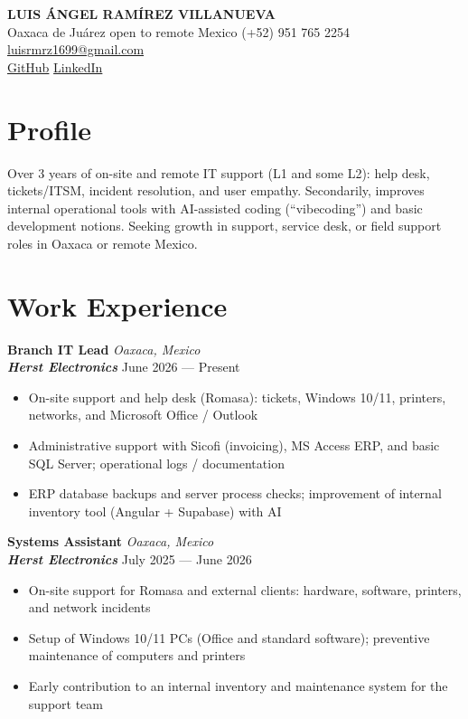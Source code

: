 \documentclass[10pt,letterpaper]{article}
\newcommand{\entry}[4]{
  \begin{minipage}[t]{\linewidth}
    \textbf{#1} \hfill \textit{#2} \\
    \textbf{\textit{#3}} \hfill #4
  \end{minipage}
}
\begin{document}

\begin{center}
	{\huge\bfseries LUIS ÁNGEL RAMÍREZ VILLANUEVA}\\[3pt]
	Oaxaca de Juárez \textbullet{} open to remote Mexico \textbullet{} (+52) 951 765 2254 \textbullet{}
	\href{mailto:luisrmrz1699@gmail.com}{luisrmrz1699@gmail.com}\\[3pt]
	\href{https://github.com/luisrmrz16}{GitHub} \textbullet{}
	\href{https://www.linkedin.com/in/luisrmrz16/}{LinkedIn}
\end{center}

\section*{Profile}

Over 3 years of on-site and remote IT support (L1 and some L2): help desk, tickets/ITSM, incident resolution, and user empathy. Secondarily, improves internal operational tools with AI-assisted coding (``vibecoding'') and basic development notions. Seeking growth in support, service desk, or field support roles in Oaxaca or remote Mexico.

\section*{Work Experience}

\entry
{Branch IT Lead}
{Oaxaca, Mexico}
{Herst Electronics}
{June 2026 --- Present}
\begin{itemize}
	\item On-site support and help desk (Romasa): tickets, Windows 10/11, printers, networks, and Microsoft Office / Outlook
	\item Administrative support with Sicofi (invoicing), MS Access ERP, and basic SQL Server; operational logs / documentation
	\item ERP database backups and server process checks; improvement of internal inventory tool (Angular + Supabase) with AI
\end{itemize}

\entry
{Systems Assistant}
{Oaxaca, Mexico}
{Herst Electronics}
{July 2025 --- June 2026}
\begin{itemize}
	\item On-site support for Romasa and external clients: hardware, software, printers, and network incidents
	\item Setup of Windows 10/11 PCs (Office and standard software); preventive maintenance of computers and printers
	\item Early contribution to an internal inventory and maintenance system for the support team
\end{itemize}
\end{document}
